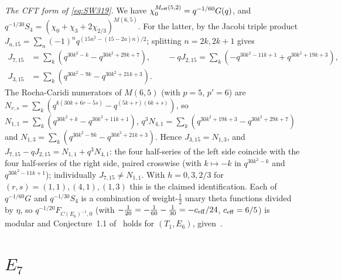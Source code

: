 \documentclass[11pt]{amsart}
\theoremstyle{definition}
\numberwithin{equation}{section}
\begin{document}
\emph{The CFT form of \eqref{eq:SW319}.} We have $\chi_0^{M_{\rm eff}(5,2)}=q^{-1/60}G(q)$, and
$q^{-1/30}S_4=(\chi_0+\chi_3+2\chi_{2/3})^{M(6,5)}$. For the latter, by the Jacobi triple product
$J_{a,15}=\sum_n(-1)^nq^{(15n^2-(15-2a)n)/2}$; splitting $n=2k,2k+1$ gives
\begin{align*}
J_{7,15}&=\textstyle\sum_k(q^{30k^2-k}-q^{30k^2+29k+7}),\qquad
-qJ_{2,15}=\sum_k(-q^{30k^2-11k+1}+q^{30k^2+19k+3}),\\
J_{3,15}&=\textstyle\sum_k(q^{30k^2-9k}-q^{30k^2+21k+3}).
\end{align*}
The Rocha-Caridi numerators of $M(6,5)$ (with $p=5$, $p'=6$) are $N_{r,s}=\sum_k(q^{k(30k+6r-5s)}-q^{(5k+r)(6k+s)})$, so
$N_{1,1}=\sum_k(q^{30k^2+k}-q^{30k^2+11k+1})$, $q^3N_{4,1}=\sum_k(q^{30k^2+19k+3}-q^{30k^2+29k+7})$ and
$N_{1,3}=\sum_k(q^{30k^2-9k}-q^{30k^2+21k+3})$. Hence $J_{3,15}=N_{1,3}$, and
$J_{7,15}-qJ_{2,15}=N_{1,1}+q^3N_{4,1}$: the four half-series of the left side coincide with the four
half-series of the right side, paired crosswise (with $k\mapsto-k$ in $q^{30k^2-k}$ and $q^{30k^2-11k+1}$);
individually $J_{7,15}\ne N_{1,1}$. With $h=0,3,2/3$ for $(r,s)=(1,1),(4,1),(1,3)$ this is the claimed
identification. Each of $q^{-1/60}G$ and $q^{-1/30}S_4$ is a combination of weight-$\frac12$ unary theta
functions divided by $\eta$, so $q^{-1/20}F_{C(E_6)^{-1},0}$ (with $-\frac1{20}=-\frac1{60}-\frac1{30}=-c_{\rm eff}/24$,
$c_{\rm eff}=6/5$) is modular and Conjecture~1.1 of~\cite{SW} holds for $(T_1,E_6)$,
given~\cite[Theorem~1.4]{CRW}.

\section{\texorpdfstring{$E_7$}{E7}}\label{sec:E7}
\end{document}

